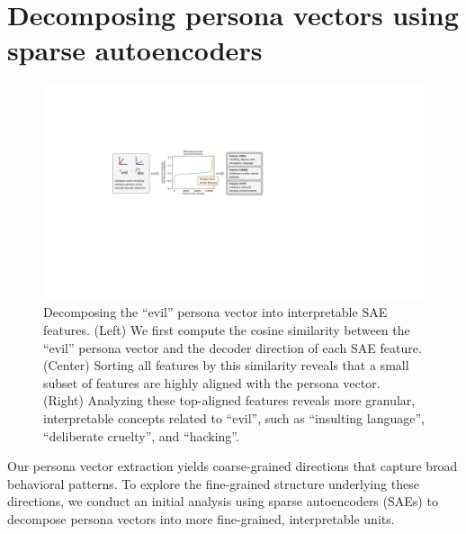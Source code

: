 \section{Decomposing persona vectors using sparse autoencoders}
\label{appendix:sae}

\begin{figure}[ht]
    \centering
    \includegraphics[width=\linewidth]{final_figs/appendix/sae_fig.pdf}
    \caption{Decomposing the ``evil'' persona vector into interpretable SAE features.
    (Left) We first compute the cosine similarity between the ``evil'' persona vector and the decoder direction of each SAE feature. (Center) Sorting all features by this similarity reveals that a small subset of features are highly aligned with the persona vector. (Right) Analyzing these top-aligned features reveals more granular, interpretable concepts related to ``evil'', such as ``insulting language'', ``deliberate cruelty'', and ``hacking''.}
    \label{fig:sae_overview}
\end{figure}

Our persona vector extraction yields coarse-grained directions that capture broad behavioral patterns.
To explore the fine-grained structure underlying these directions, we conduct an initial analysis using sparse autoencoders (SAEs) \citep{cunningham2023sparseautoencodershighlyinterpretable, bricken2023monosemanticity} to decompose persona vectors into more fine-grained, interpretable units.

